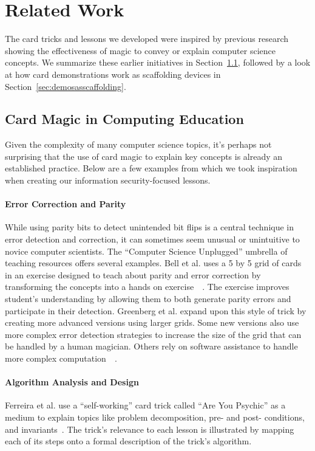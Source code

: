 \section{Related Work}
\label{SEC:related-work}

The card tricks and lessons we developed were inspired by previous research
showing the effectiveness of magic to convey or explain computer science
concepts.  We summarize these earlier initiatives in
Section~\ref{sec:magicineducation}, followed by a look at how card
demonstrations work as scaffolding devices in
Section~\ref{sec:demosasscaffolding}.

\subsection{Card Magic in Computing Education}
\label{sec:magicineducation}
Given the complexity of many computer science topics, it's perhaps not
surprising that the use of card magic to explain key concepts is already an
established practice.  Below are a few examples from which we took inspiration
when creating our information security-focused lessons.

\paragraph{Error Correction and Parity}
While using parity bits to detect unintended bit flips is a central technique
in error detection and correction, it can sometimes seem unusual or unintuitive
to novice computer scientists.
The ``Computer Science Unplugged'' umbrella of teaching resources offers
several examples.  Bell et al. uses
a 5 by 5 grid of cards in an exercise designed to teach about parity and
error correction by transforming the concepts into a hands on
exercise~\cite{bell2009computer}~\cite{csunplugged}.  The exercise improves
student's understanding by allowing them to both generate parity errors and
participate in their detection.
Greenberg et al. expand upon this style of trick by creating more advanced
versions using larger grids.  Some new versions also use
more complex error detection
strategies to increase the size of the grid that can be handled by a human
magician.  Others rely on software assistance to handle more complex
computation~\cite{Greenberg2017}~\cite{Greenberg2018}.

\paragraph{Algorithm Analysis and Design}
Ferreira et al. use a ``self-working'' card trick called ``Are You Psychic''
as a medium to explain topics
like problem decomposition, pre- and post- conditions, and
invariants~\cite{ferreira2014magic}.
The trick's relevance to each lesson is illustrated by
mapping each of its steps
onto a formal description of the trick's algorithm.

